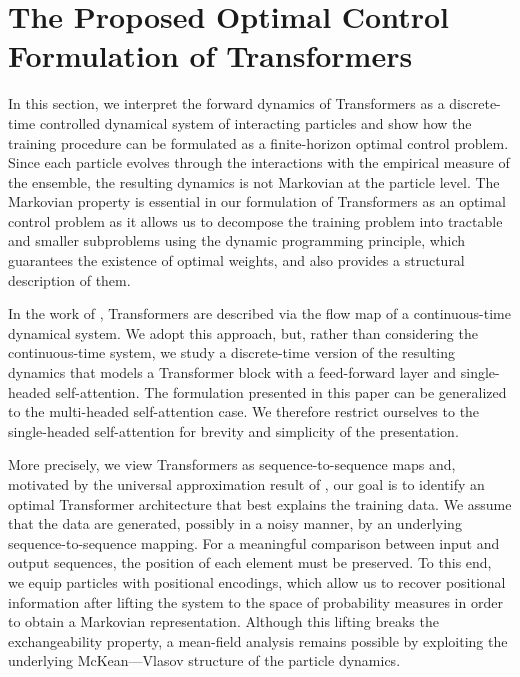 \documentclass[11pt]{article}
\begin{document}
\section{The Proposed Optimal Control Formulation of Transformers}\label{sec:formulation}
In this section, we interpret the forward dynamics of  Transformers as a discrete-time controlled dynamical system of interacting particles and show how the training procedure can be formulated as a finite-horizon optimal control problem. Since each particle evolves through the interactions with the empirical measure of the ensemble, the resulting dynamics is not Markovian at the particle level. The Markovian property is essential in our formulation of Transformers as an optimal control problem as it allows us to decompose the training problem into tractable and smaller subproblems using the dynamic programming principle, which guarantees the existence of optimal weights, and also provides a structural description of them.

In the work of \cite{geshkovski2025mathematical}, Transformers are described via the flow map of a continuous-time dynamical system. We adopt this approach, but, rather than considering the continuous-time system, we study a discrete-time version of the resulting dynamics that models a Transformer block with a feed-forward layer and single-headed self-attention. The formulation presented in this paper can be generalized to the multi-headed self-attention case. We therefore restrict ourselves to the single-headed self-attention for brevity and simplicity of the presentation. 

More precisely, we view Transformers as sequence-to-sequence maps and, motivated by the universal approximation result of \cite{yun2019transformers}, our goal is to identify an optimal Transformer architecture that best explains the training data. We assume that the data are generated, possibly in a noisy manner, by an underlying sequence-to-sequence mapping. For a meaningful comparison between input and output sequences, the position of each element must be preserved. To this end, we equip particles with positional encodings, which allow us to recover positional information after lifting the system to the space of probability measures in order to obtain a Markovian representation. Although this lifting breaks the exchangeability property, a mean-field analysis remains possible by exploiting the underlying McKean---Vlasov structure of the particle dynamics.
\medskip
\end{document}

